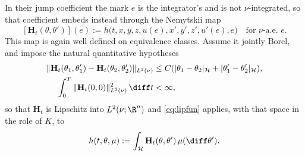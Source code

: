 \begin{example}
In their jump coefficient the mark $e$ is the integrator's and is not $\nu$-integrated, so
that coefficient embeds instead through the Nemytskii map
\[
[\mathbf H_t(\theta,\theta')](e):=\bar h\bigl(t,x,y,z,u(e),x',y',z',u'(e),e\bigr)
\quad\text{for $\nu$-a.e.\ }e .
\]
This map is again well defined on equivalence classes. Assume it jointly Borel, and impose the
natural quantitative hypotheses
\[
\begin{aligned}
\|\mathbf H_t(\theta_1,\theta_1')-\mathbf H_t(\theta_2,\theta_2')\|_{L^2(\nu)}
&\le C(|\theta_1-\theta_2|_{\mathcal H}+|\theta_1'-\theta_2'|_{\mathcal H}),\\
\int_0^T\|\mathbf H_t(0,0)\|_{L^2(\nu)}^2\,\diff t&<\infty ,
\end{aligned}
\]
so that $\mathbf H_t$ is Lipschitz into $L^2(\nu;\R^n)$ and \eqref{eq:lipfun} applies,
with that space in the role of $K$, to
\[
h(t,\theta,\mu):=\int_{\mathcal H}\mathbf H_t(\theta,\theta')\,\mu(\diff\theta') .
\]
\end{example}

